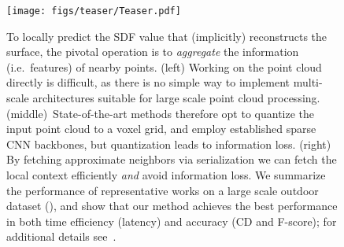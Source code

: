\begin{figure}[t]
\centering
\texttt{[image: figs/teaser/Teaser.pdf]}\\
\vspace{1em}
\caption{
To locally predict the SDF value that (implicitly) reconstructs the surface, the pivotal operation is to \textit{aggregate} the information (i.e.~features) of nearby points.
(left) Working on the point cloud directly is difficult, as there is no simple way to implement multi-scale architectures suitable for large scale point cloud processing.
(middle)~State-of-the-art methods therefore opt to quantize the input point cloud to a voxel grid, and employ established sparse CNN backbones, but quantization leads to information loss.
(right) By fetching approximate neighbors via serialization we can fetch the local context efficiently \textit{and} avoid information loss.
{We summarize the performance of representative works on a large scale outdoor dataset (\carla), and show that our method achieves the best performance in both time efficiency (latency) and accuracy (CD and F-score); for additional details see~. }
}
\label{fig:teaser}
\vspace{-1em}
\end{figure}


\endinput

